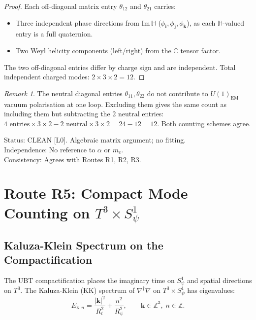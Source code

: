 \documentclass[12pt,a4paper]{article}
\theoremstyle{definition}
\theoremstyle{remark}
\newtheorem{remark}[theorem]{Remark}
\begin{document}
\begin{proof}
Each off-diagonal matrix entry $\theta_{12}$ and $\theta_{21}$ carries:
\begin{itemize}
  \item Three independent phase directions from Im$\,\mathbb{H}$
    ($\phi_\mathbf{i}, \phi_\mathbf{j}, \phi_\mathbf{k}$), as each
    $\mathbb{H}$-valued entry is a full quaternion.
  \item Two Weyl helicity components (left/right) from the $\mathbb{C}$ tensor
    factor.
\end{itemize}
The two off-diagonal entries differ by charge sign and are independent.
Total independent charged modes: $2 \times 3 \times 2 = 12$.
\end{proof}

\begin{remark}
The neutral diagonal entries $\theta_{11}, \theta_{22}$ do not contribute to
$U(1)_{\mathrm{EM}}$ vacuum polarisation at one loop.  Excluding them gives the
same count as including them but subtracting the 2 neutral entries:
$4\text{ entries}\times 3\times 2 - 2\text{ neutral}\times 3\times 2 = 24 - 12 = 12$.
Both counting schemes agree.
\end{remark}

\begin{resultbox}
Status: CLEAN [L0].  Algebraic matrix argument; no fitting.\\
Independence: No reference to $\alpha$ or $m_e$.\\
Consistency: Agrees with Routes R1, R2, R3.
\end{resultbox}

\section{Route R5: Compact Mode Counting on $T^3\times S^1_\psi$}
\label{sec:neff12:R5}

\subsection{Kaluza-Klein Spectrum on the Compactification}
\label{ssec:neff12:R5:KK}

The UBT compactification places the imaginary time on $S^1_\psi$ and spatial
directions on $T^3$.  The Kaluza-Klein (KK) spectrum of $\nabla^\dagger\nabla$
on $T^3\times S^1_\psi$ has eigenvalues:
\begin{equation}
  E_{\mathbf{k},n} = \frac{|\mathbf{k}|^2}{R_t^2} + \frac{n^2}{R_\psi^2},
  \qquad \mathbf{k}\in\mathbb{Z}^3,\; n\in\mathbb{Z}.
  \label{eq:neff12:R5:KK}
\end{equation}
\end{document}
